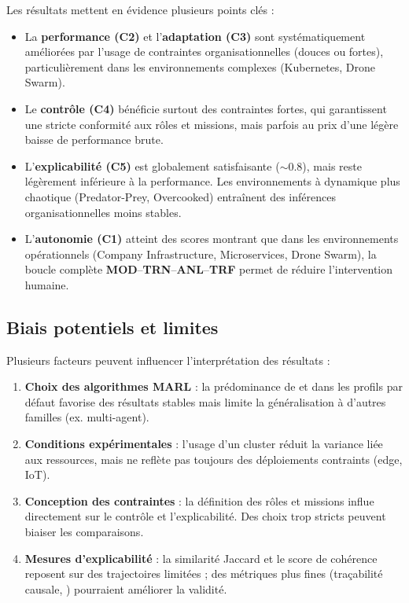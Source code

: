 Les résultats mettent en évidence plusieurs points clés :
\begin{itemize}
  \item La \textbf{performance (C2)} et l'\textbf{adaptation (C3)} sont systématiquement améliorées par l'usage de contraintes organisationnelles (douces ou fortes), particulièrement dans les environnements complexes (Kubernetes, Drone Swarm).
  \item Le \textbf{contrôle (C4)} bénéficie surtout des contraintes fortes, qui garantissent une stricte conformité aux rôles et missions, mais parfois au prix d'une légère baisse de performance brute.
  \item L'\textbf{explicabilité (C5)} est globalement satisfaisante ($\sim 0.8$), mais reste légèrement inférieure à la performance. Les environnements à dynamique plus chaotique (Predator-Prey, Overcooked) entraînent des inférences organisationnelles moins stables.
  \item L'\textbf{autonomie (C1)} atteint des scores montrant que dans les environnements opérationnels (Company Infrastructure, Microservices, Drone Swarm), la boucle complète \textbf{MOD}–\textbf{TRN}–\textbf{ANL}–\textbf{TRF} permet de réduire l'intervention humaine.
\end{itemize}

\subsection{Biais potentiels et limites}

Plusieurs facteurs peuvent influencer l'interprétation des résultats :
\begin{enumerate}[label={\alph*)}]
  \item \textbf{Choix des algorithmes MARL} : la prédominance de  et  dans les profils par défaut favorise des résultats stables mais limite la généralisation à d'autres familles (ex.  multi-agent).
  \item \textbf{Conditions expérimentales} : l'usage d'un cluster  réduit la variance liée aux ressources, mais ne reflète pas toujours des déploiements contraints (edge, IoT).
  \item \textbf{Conception des contraintes} : la définition des rôles et missions influe directement sur le contrôle et l'explicabilité. Des choix trop stricts peuvent biaiser les comparaisons.
  \item \textbf{Mesures d'explicabilité} : la similarité Jaccard et le score de cohérence reposent sur des trajectoires limitées ; des métriques plus fines (traçabilité causale, ) pourraient améliorer la validité.
\end{enumerate}

